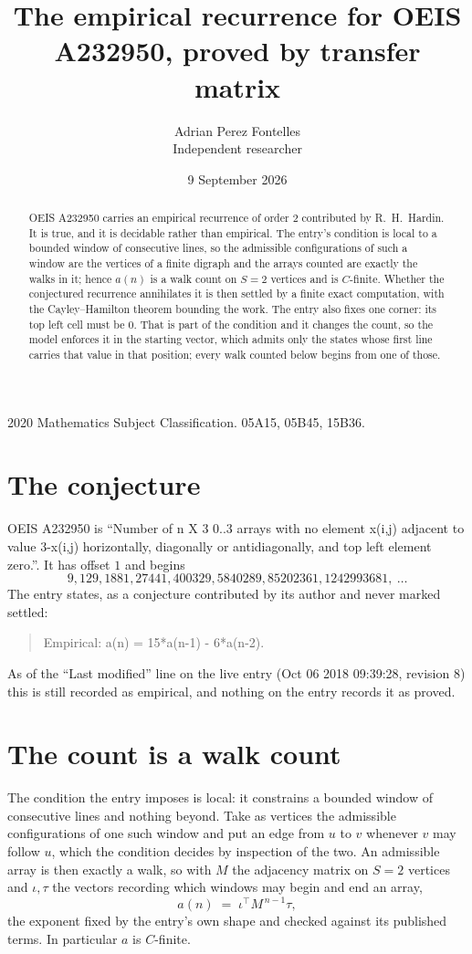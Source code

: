 \documentclass[11pt,a4paper]{article}
\title{The empirical recurrence for OEIS A232950, proved by transfer matrix}
\author{Adrian Perez Fontelles\\ \small Independent researcher}
\date{9 September 2026}
\theoremstyle{plain}
\theoremstyle{definition}
\begin{document}
\maketitle

\begin{abstract}
OEIS A232950 carries an empirical recurrence of order $2$ contributed by R.~H.~Hardin. It is
true, and it is decidable rather than empirical. The entry's condition is local to a bounded window of consecutive lines, so
the admissible configurations of such a window are the vertices of a finite digraph and the
arrays counted are exactly the walks in it; hence $a(n)$ is a walk count on $S=2$ vertices
and is $C$-finite. Whether the conjectured recurrence annihilates it is then settled by a
finite exact computation, with the Cayley--Hamilton theorem bounding the work.
 The entry also fixes one corner: its top left cell must be $0$. That is part of the condition and it changes the count, so the model enforces it in the starting vector, which admits only the states whose first line carries that value in that position; every walk counted below begins from one of those.\end{abstract}

\noindent\small 2020 Mathematics Subject Classification. 05A15, 05B45, 15B36.\normalsize

\section{The conjecture}

OEIS A232950 is ``Number of n X 3 0..3 arrays with no element x(i,j) adjacent to value 3-x(i,j) horizontally, diagonally or antidiagonally, and top left element zero.''. It has offset $1$ and begins
\[
9, 129, 1881, 27441, 400329, 5840289, 85202361, 1242993681,\ \dots
\]
The entry states, as a conjecture contributed by its author and never marked settled:
\begin{quote}
Empirical: a(n) = 15*a(n-1) - 6*a(n-2).
\end{quote}
As of the ``Last modified'' line on the live entry (Oct 06 2018 09:39:28, revision 8) this is still
recorded as empirical, and nothing on the entry records it as proved.

\section{The count is a walk count}

The condition the entry imposes is local: it constrains a bounded window of consecutive lines and nothing beyond. Take as
vertices the admissible configurations of one such window and put an edge from $u$ to $v$
whenever $v$ may follow $u$, which the condition decides by inspection of the two. An
admissible array is then exactly a walk, so with $M$ the adjacency matrix on $S=2$ vertices
and $\iota,\tau$ the vectors recording which windows may begin and end an array,
\[
a(n)\;=\;\iota^{\!\top}M^{\,n-1}\tau ,
\]
the exponent fixed by the entry's own shape and checked against its published terms. In
particular $a$ is $C$-finite.
\end{document}

